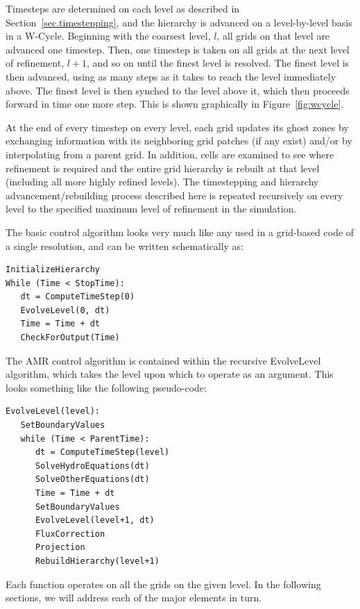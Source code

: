 Timesteps are determined on each level as described in
Section~\ref{sec.timestepping}, and the hierarchy is advanced on a
level-by-level basis in a W-Cycle.  Beginning with the coarsest level,
$l$, all grids on that level are advanced one timestep.  Then, one
timestep is taken on all grids at the next level of refinement, $l+1$,
and so on until the finest level is resolved. The finest level is then
advanced, using as many steps as it takes to reach the level
immediately above.  The finest level is then synched to the level
above it, which then proceeds forward in time one more step.  This is
shown graphically in Figure~\ref{fig:wcycle}.


At the end of every timestep on every level, each grid updates its
ghost zones by exchanging information with its neighboring grid
patches (if any exist) and/or by interpolating from a parent grid.  In
addition, cells are examined to see where refinement is required and
the entire grid hierarchy is rebuilt at that level (including all more
highly refined levels).  The timestepping and hierarchy
advancement/rebuilding process described here is repeated recursively
on every level to the specified maximum level of refinement in the
simulation.

The basic control algorithm looks very much like any used in a
grid-based code of a single resolution, and can be written
schematically as:

\begin{verbatim}
InitializeHierarchy
While (Time < StopTime):
   dt = ComputeTimeStep(0)
   EvolveLevel(0, dt)
   Time = Time + dt
   CheckForOutput(Time)
\end{verbatim}

The AMR control algorithm is contained within the recursive
EvolveLevel algorithm, which takes the level upon which to operate as
an argument.  This looks something like the following pseudo-code:

\begin{verbatim}
EvolveLevel(level):
   SetBoundaryValues
   while (Time < ParentTime):
      dt = ComputeTimeStep(level)
      SolveHydroEquations(dt)
      SolveOtherEquations(dt)
      Time = Time + dt
      SetBoundaryValues
      EvolveLevel(level+1, dt)
      FluxCorrection
      Projection
      RebuildHierarchy(level+1)
\end{verbatim}

Each function operates on all the grids on the given level.  In the
following sections, we will address each of the major elements in
turn.



